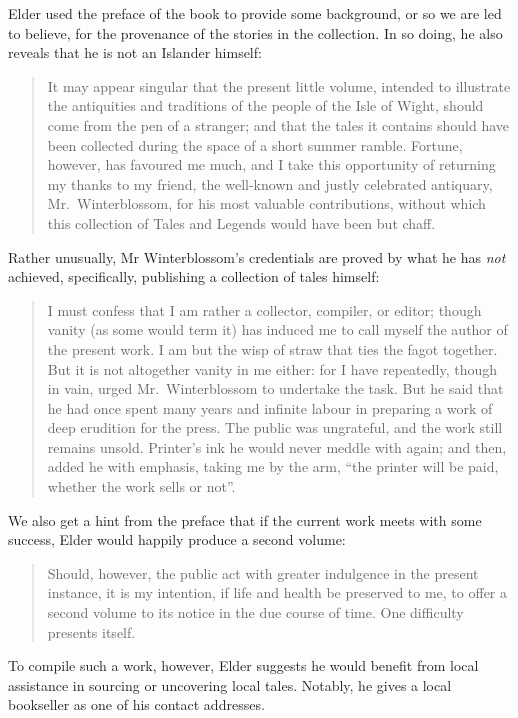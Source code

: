 \documentclass[
  12pt,
  a5paper,
  twoside]{book}
\begin{document}
Elder used the preface of the book to provide some background, or so we
are led to believe, for the provenance of the stories in the collection.
In so doing, he also reveals that he is not an Islander himself:

\begin{quote}
It may appear singular that the present little volume, intended to
illustrate the antiquities and traditions of the people of the Isle of
Wight, should come from the pen of a stranger; and that the tales it
contains should have been collected during the space of a short summer
ramble. Fortune, however, has favoured me much, and I take this
opportunity of returning my thanks to my friend, the well-known and
justly celebrated antiquary, Mr.~Winterblossom, for his most valuable
contributions, without which this collection of Tales and Legends would
have been but chaff.
\end{quote}

Rather unusually, Mr Winterblossom's credentials are proved by what he
has \emph{not} achieved, specifically, publishing a collection of tales
himself:

\begin{quote}
I must confess that I am rather a collector, compiler, or editor; though
vanity (as some would term it) has induced me to call myself the author
of the present work. I am but the wisp of straw that ties the fagot
together. But it is not altogether vanity in me either: for I have
repeatedly, though in vain, urged Mr.~Winterblossom to undertake the
task. But he said that he had once spent many years and infinite labour
in preparing a work of deep erudition for the press. The public was
ungrateful, and the work still remains unsold. Printer's ink he would
never meddle with again; and then, added he with emphasis, taking me by
the arm, ``the printer will be paid, whether the work sells or not''.
\end{quote}

We also get a hint from the preface that if the current work meets with
some success, Elder would happily produce a second volume:

\begin{quote}
Should, however, the public act with greater indulgence in the present
instance, it is my intention, if life and health be preserved to me, to
offer a second volume to its notice in the due course of time. One
difficulty presents itself.
\end{quote}

To compile such a work, however, Elder suggests he would benefit from
local assistance in sourcing or uncovering local tales. Notably, he
gives a local bookseller as one of his contact addresses.
\end{document}
